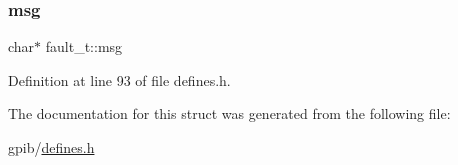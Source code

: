 \subsubsection{\texorpdfstring{msg}{msg}}
{\footnotesize\ttfamily char$\ast$ fault\+\_\+t\+::msg}



Definition at line 93 of file defines.\+h.



The documentation for this struct was generated from the following file\+:\begin{DoxyCompactItemize}
\item 
gpib/\hyperlink{defines_8h}{defines.\+h}\end{DoxyCompactItemize}
